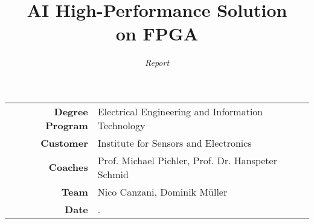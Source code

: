 \documentclass[final]{fhnwreport}
\title{\textbf{{\Huge AI High-Performance Solution \\[2mm] on FPGA}}}
\author{\textit{{\LARGE Report}}}
\date{}
\begin{document}
\maketitle
\vfill
\begin{center}
	\begin{tabular}{>{\bfseries\large}rl}
		Degree Program	& Electrical Engineering and Information Technology \\[2mm]
		Customer		& Institute for Sensors and Electronics \\[2mm]
		Coaches			& Prof. Michael Pichler, Prof. Dr. Hanspeter Schmid \\[2mm]
		Team			& Nico Canzani, Dominik M\"uller \\[2mm]
		Date			& \the\day.\MONTH \the\year
	\end{tabular}
\end{center}
\clearpage

\tableofcontents
\clearpage





%

\end{document}
